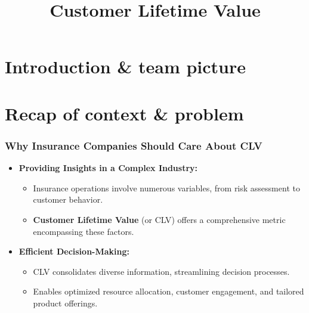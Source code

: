 \documentclass[aspectratio=169,xcolor=x11names,compress]{beamer}
\title{Customer Lifetime Value}
\author{}
\institute{}
\date{}
\begin{document}
\maketitle

\section{Introduction \& team picture}

\section{Recap of context \& problem}

\begin{frame}
\frametitle{Why Insurance Companies Should Care About CLV}

\begin{itemize}
  \item \textbf{Providing Insights in a Complex Industry:}
  \begin{itemize}
    \item Insurance operations involve numerous variables, from risk assessment to customer behavior.
    \item \textbf{Customer Lifetime Value} (or CLV) offers a comprehensive metric encompassing these factors.
  \end{itemize}
  
  \item \textbf{Efficient Decision-Making:}
  \begin{itemize}
    \item CLV consolidates diverse information, streamlining decision processes.
    \item Enables optimized resource allocation, customer engagement, and tailored product offerings.
  \end{itemize}
\end{itemize}

\end{frame}
\end{document}
